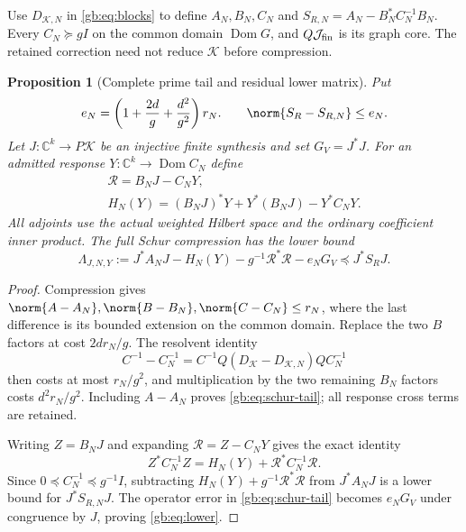 \documentclass[11pt,a4paper]{article}
\numberwithin{equation}{section}
\newtheorem{proposition}[theorem]{Proposition}
\theoremstyle{definition}\newtheorem{definition}[theorem]{Definition}
\theoremstyle{remark}\newtheorem{remark}[theorem]{Remark}
\newcommand{\dom}{\operatorname{Dom}}\newcommand{\Var}{\operatorname{Var}}
\newcommand{\Kk}{\mathcal K}\newcommand{\Aa}{\mathcal A}\newcommand{\Ff}{\mathcal F}
\begin{document}
Use $D_{\Kk,N}$ in \eqref{gb:eq:blocks} to define $A_N,B_N,C_N$ and
$S_{R,N}=A_N-B_N^*C_N^{-1}B_N$. Every $C_N\succeq gI$ on the common
domain $\dom G$, and $Q\mathcal J_{\rm fin}$ is its graph core.
The retained correction need not reduce $\Kk$ before compression.

\begin{proposition}[Complete prime tail and residual lower matrix]
\label{gb:prop:residual}
Put
\begin{equation}\label{gb:eq:schur-tail}
 e_N=\left(1+\frac{2d}{g}+\frac{d^2}{g^2}\right)r_N.
 \qquad \norm{S_R-S_{R,N}}\le e_N.
\end{equation}
Let $J:\mathbb C^k\to P\Kk$ be an injective finite synthesis and set
$G_V=J^*J$. For an admitted response
$Y:\mathbb C^k\to\dom C_N$ define
\begin{gather*}
 \mathcal R=B_NJ-C_NY,\\
 H_N(Y)=(B_NJ)^*Y+Y^*(B_NJ)-Y^*C_NY.
\end{gather*}
All adjoints use the actual weighted Hilbert space and the ordinary
coefficient inner product. The full Schur compression has the lower bound
\begin{equation}\label{gb:eq:lower}
 \Lambda_{J,N,Y}:=J^*A_NJ-H_N(Y)-g^{-1}\mathcal R^*\mathcal R-e_NG_V
       \preceq J^*S_RJ.
\end{equation}
\end{proposition}
\begin{proof}
Compression gives
$\norm{A-A_N},\norm{B-B_N},\norm{C-C_N}\le r_N$,
where the last difference is its bounded extension on the common domain.
Replace the two $B$ factors at cost $2dr_N/g$. The resolvent identity
\[
 C^{-1}-C_N^{-1}=C^{-1}Q(D_\Kk-D_{\Kk,N})QC_N^{-1}
\]
then costs at most $r_N/g^2$, and multiplication by the two remaining
$B_N$ factors costs $d^2r_N/g^2$. Including $A-A_N$ proves
\eqref{gb:eq:schur-tail}; all response cross terms are retained.

Writing $Z=B_NJ$ and expanding $\mathcal R=Z-C_NY$ gives the exact
identity
\begin{equation}\label{gb:eq:residual-identity}
 Z^*C_N^{-1}Z=H_N(Y)+\mathcal R^*C_N^{-1}\mathcal R.
\end{equation}
Since $0\preceq C_N^{-1}\preceq g^{-1}I$, subtracting
$H_N(Y)+g^{-1}\mathcal R^*\mathcal R$ from $J^*A_NJ$ is a lower
bound for $J^*S_{R,N}J$. The operator error in
\eqref{gb:eq:schur-tail} becomes $e_NG_V$ under congruence by $J$,
proving \eqref{gb:eq:lower}.
\end{proof}
\end{document}
